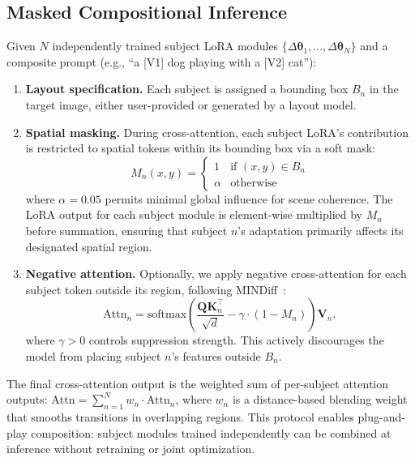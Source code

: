 \documentclass{article}
\begin{document}
\subsection{Masked Compositional Inference}
\label{sec:masked_inference}

Given $N$ independently trained subject LoRA modules $\{\Delta\boldsymbol{\theta}_1, \ldots, \Delta\boldsymbol{\theta}_N\}$ and a composite prompt (e.g., ``a [V1] dog playing with a [V2] cat''):

\begin{enumerate}
    \item \textbf{Layout specification.} Each subject is assigned a bounding box $B_n$ in the target image, either user-provided or generated by a layout model.
    \item \textbf{Spatial masking.} During cross-attention, each subject LoRA's contribution is restricted to spatial tokens within its bounding box via a soft mask:
    \begin{equation}
        M_n(x, y) = \begin{cases} 1 & \text{if } (x,y) \in B_n \\ \alpha & \text{otherwise} \end{cases}
    \end{equation}
    where $\alpha = 0.05$ permits minimal global influence for scene coherence.
    The LoRA output for each subject module is element-wise multiplied by $M_n$ before summation, ensuring that subject $n$'s adaptation primarily affects its designated spatial region.
    \item \textbf{Negative attention.} Optionally, we apply negative cross-attention for each subject token outside its region, following MINDiff~\citep{mindiff2025}:
    \begin{equation}
        \text{Attn}_n = \text{softmax}\!\left(\frac{\mathbf{Q}\mathbf{K}_n^\top}{\sqrt{d}} - \gamma \cdot (1 - M_n)\right) \mathbf{V}_n,
    \end{equation}
    where $\gamma > 0$ controls suppression strength.
    This actively discourages the model from placing subject $n$'s features outside $B_n$.
\end{enumerate}

The final cross-attention output is the weighted sum of per-subject attention outputs:
$\text{Attn} = \sum_{n=1}^N w_n \cdot \text{Attn}_n$,
where $w_n$ is a distance-based blending weight that smooths transitions in overlapping regions.
This protocol enables plug-and-play composition: subject modules trained independently can be combined at inference without retraining or joint optimization.
\end{document}
